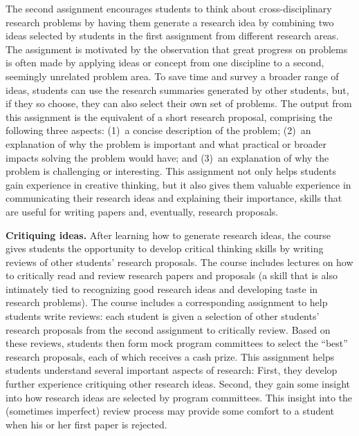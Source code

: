 The second assignment encourages students to think about
cross-disciplinary research problems by having them generate a research
idea by combining two ideas selected by students in the first assignment
from different research areas.  The assignment is motivated by the
observation that great progress on problems is often made by applying
ideas or concept from one discipline to a second, seemingly unrelated
problem area.  To save time and survey a broader range of ideas,
students can use the research summaries generated by other students,
but, if they so choose, they can also select their own set of problems.
The output from this assignment is the equivalent of a short research
proposal, comprising the following three aspects: (1)~a concise
description of the problem; (2)~an explanation of why the problem is
important and what practical or broader impacts solving the problem
would have; and (3)~an explanation of why the problem is challenging or
interesting.  This assignment not only helps students gain experience in
creative thinking, but it also gives them valuable experience in
communicating their research ideas and explaining their importance,
skills that are useful for writing papers and, eventually, research
proposals.

\vspace*{0.1in}
\noindent
{\bf Critiquing ideas.}  After learning how to generate research ideas,
the course gives students the opportunity to develop critical thinking
skills by writing reviews of other students' research proposals.  The
course includes lectures on how to critically read and review research
papers and proposals (a skill that is also intimately tied to
recognizing good research ideas and developing taste in research
problems).  The course includes a corresponding assignment to help
students write reviews: each student is given a selection of other
students' research proposals from the second assignment to critically
review.  Based on these reviews, students then form mock program
committees to select the ``best'' research proposals, each of which
receives a cash prize.  This assignment helps students understand
several important aspects of research: First, they develop further
experience critiquing other research ideas.  Second, they gain some
insight into how research ideas are selected by program committees.
This insight into the (sometimes imperfect) review process may provide
some comfort to a student when his or her first paper is rejected.

